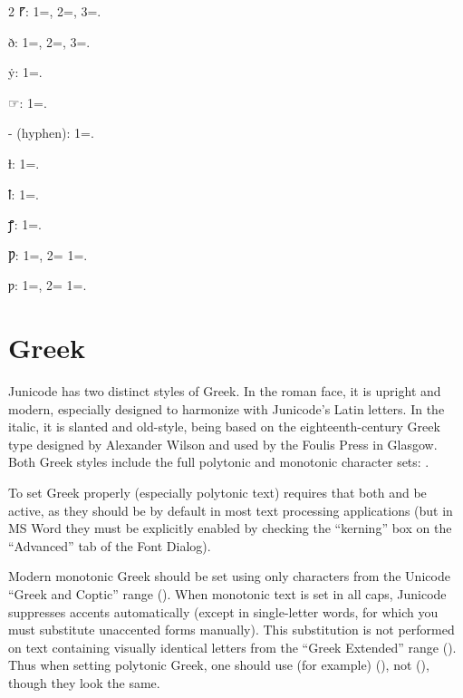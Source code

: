 \begin{multicols}{2}
\color{GGOrange} ⹍: 1=, 2=, 3=.

{ð: 1=, 2=, 3=.}

ẏ: 1=.

☞: 1=.

- (hyphen): 1=.

ƚ: 1=.

ꝉ: 1=.

ꝭ: 1=.

Ƿ: 1=, 2= 1=.

ƿ: 1=, 2= 1=.
\end{multicols}


\section{Greek}\hypertarget{greek}{}
Junicode has two distinct styles of Greek. In the roman face, it is upright and
modern, especially designed to harmonize with Junicode's Latin letters. In the
italic, it is slanted and old-style, being based on the eighteenth-century
Greek type designed by Alexander Wilson and used by the Foulis Press in
Glasgow. Both Greek styles include the full polytonic and monotonic character
sets: .

To set Greek properly (especially polytonic text) requires that both 
and  be active, as they should be by default in most
text processing applications (but in MS Word they must be explicitly enabled
by checking the “kerning” box on the “Advanced” tab of the Font Dialog).

Modern monotonic Greek should be set using only characters from the Unicode “Greek
and Coptic” range (). When monotonic text is set in all caps, Junicode
suppresses accents automatically (except in single-letter words, for which
you must substitute unaccented forms manually). This substitution is not
performed on text containing visually identical letters from the “Greek Extended”
range ().
Thus when setting polytonic Greek, one should use (for example) 
(), not  (),
though they look the same.

